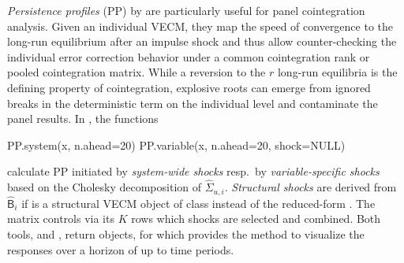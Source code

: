 \textit{Persistence profiles} (PP) by \citet{PesaranShin1996} are particularly useful for panel cointegration analysis. Given an individual VECM, they map the speed of convergence to the long-run equilibrium after an impulse shock and thus allow counter-checking the individual error correction behavior under a common cointegration rank or pooled cointegration matrix. While a reversion to the $r$ long-run equilibria is the defining property of cointegration, explosive roots can emerge from ignored breaks in the deterministic term on the individual level and contaminate the panel results. In , the functions 
\begin{CodeChunk}
\begin{CodeInput}
PP.system(x,   n.ahead=20)
PP.variable(x, n.ahead=20, shock=NULL)
\end{CodeInput}
\end{CodeChunk}
calculate PP initiated by \textit{system-wide shocks} resp.~by \textit{variable-specific shocks} based on the Cholesky decomposition of $ \widehat{\Sigma}_{u,i} $. \textit{Structural shocks} are derived from $ \widehat{\mathsf{B}}_i $ if  is a structural VECM object of class  instead of the reduced-form . The matrix  controls via its $K$ rows which shocks are selected and combined. Both tools,  and , return  objects, for which  provides the  method to visualize the responses over a horizon of up to  time periods.



